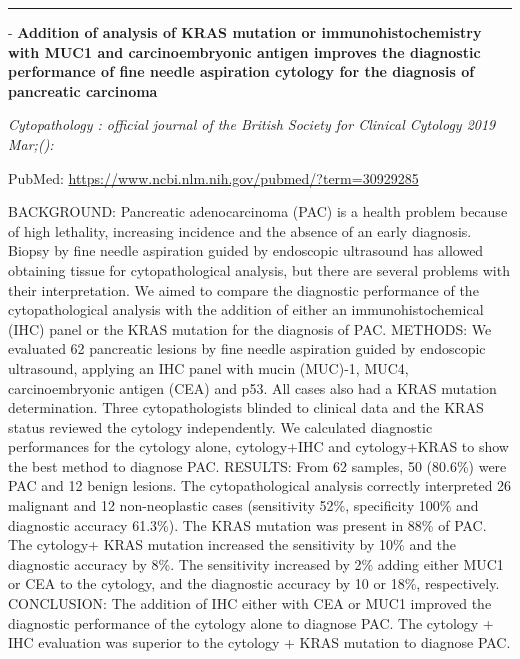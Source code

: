 \documentclass[]{article}
\begin{document}
{}

{}

\begin{center}\rule{0.5\linewidth}{\linethickness}\end{center}

 - \textbf{Addition of analysis of KRAS mutation or immunohistochemistry
with MUC1 and carcinoembryonic antigen improves the diagnostic
performance of fine needle aspiration cytology for the diagnosis of
pancreatic carcinoma}

\emph{Cytopathology : official journal of the British Society for
Clinical Cytology 2019 Mar;():}

PubMed: \url{https://www.ncbi.nlm.nih.gov/pubmed/?term=30929285}

BACKGROUND: Pancreatic adenocarcinoma (PAC) is a health problem because
of high lethality, increasing incidence and the absence of an early
diagnosis. Biopsy by fine needle aspiration guided by endoscopic
ultrasound has allowed obtaining tissue for cytopathological analysis,
but there are several problems with their interpretation. We aimed to
compare the diagnostic performance of the cytopathological analysis with
the addition of either an immunohistochemical (IHC) panel or the KRAS
mutation for the diagnosis of PAC. METHODS: We evaluated 62 pancreatic
lesions by fine needle aspiration guided by endoscopic ultrasound,
applying an IHC panel with mucin (MUC)-1, MUC4, carcinoembryonic antigen
(CEA) and p53. All cases also had a KRAS mutation determination. Three
cytopathologists blinded to clinical data and the KRAS status reviewed
the cytology independently. We calculated diagnostic performances for
the cytology alone, cytology+IHC and cytology+KRAS to show the best
method to diagnose PAC. RESULTS: From 62 samples, 50 (80.6\%) were PAC
and 12 benign lesions. The cytopathological analysis correctly
interpreted 26 malignant and 12 non-neoplastic cases (sensitivity 52\%,
specificity 100\% and diagnostic accuracy 61.3\%). The KRAS mutation was
present in 88\% of PAC. The cytology+ KRAS mutation increased the
sensitivity by 10\% and the diagnostic accuracy by 8\%. The sensitivity
increased by 2\% adding either MUC1 or CEA to the cytology, and the
diagnostic accuracy by 10 or 18\%, respectively. CONCLUSION: The
addition of IHC either with CEA or MUC1 improved the diagnostic
performance of the cytology alone to diagnose PAC. The cytology + IHC
evaluation was superior to the cytology + KRAS mutation to diagnose PAC.

{}
\end{document}
